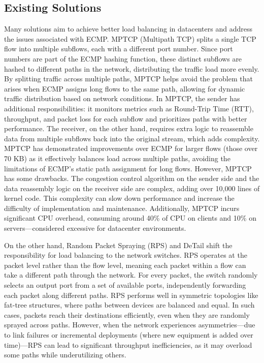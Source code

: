 \documentclass[11pt, sigplan]{acmart}
\begin{document}
\subsection{Existing Solutions}
Many solutions aim to achieve better load balancing in datacenters and address the issues associated with ECMP. MPTCP (Multipath TCP) splits a single TCP flow into multiple subflows, each with a different port number. Since port numbers are part of the ECMP hashing function, these distinct subflows are hashed to different paths in the network, distributing the traffic load more evenly. By splitting traffic across multiple paths, MPTCP helps avoid the problem that arises when ECMP assigns long flows to the same path, allowing for dynamic traffic distribution based on network conditions. In MPTCP, the sender has additional responsibilities: it monitors metrics such as Round-Trip Time (RTT), throughput, and packet loss for each subflow and prioritizes paths with better performance. The receiver, on the other hand, requires extra logic to reassemble data from multiple subflows back into the original stream, which adds complexity. MPTCP has demonstrated improvements over ECMP for larger flows (those over 70 KB) as it effectively balances load across multiple paths, avoiding the limitations of ECMP’s static path assignment for long flows. However, MPTCP has some drawbacks. The congestion control algorithm on the sender side and the data reassembly logic on the receiver side are complex, adding over 10,000 lines of kernel code. This complexity can slow down performance and increase the difficulty of implementation and maintenance. Additionally, MPTCP incurs significant CPU overhead, consuming around 40\% of CPU on clients and 10\% on servers—considered excessive for datacenter environments.

On the other hand, Random Packet Spraying (RPS) and DeTail shift the responsibility for load balancing to the network switches. RPS operates at the packet level rather than the flow level, meaning each packet within a flow can take a different path through the network. For every packet, the switch randomly selects an output port from a set of available ports, independently forwarding each packet along different paths. RPS performs well in symmetric topologies like fat-tree structures, where paths between devices are balanced and equal. In such cases, packets reach their destinations efficiently, even when they are randomly sprayed across paths. However, when the network experiences asymmetries—due to link failures or incremental deployments (where new equipment is added over time)—RPS can lead to significant throughput inefficiencies, as it may overload some paths while underutilizing others.
\end{document}
